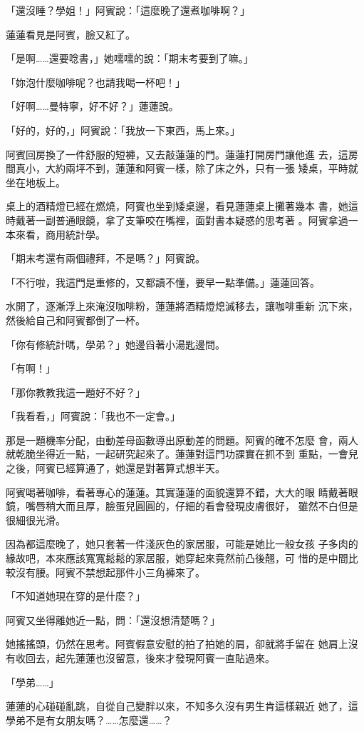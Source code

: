 「還沒睡？學姐！」阿賓說：「這麼晚了還煮咖啡啊？」

蓮蓮看見是阿賓，臉又紅了。

「是啊……還要唸書，」她嚅嚅的說：「期末考要到了嘛。」

「妳泡什麼咖啡呢？也請我喝一杯吧！」

「好啊……曼特寧，好不好？」蓮蓮說。

「好的，好的，」阿賓說：「我放一下東西，馬上來。」

阿賓回房換了一件舒服的短褲，又去敲蓮蓮的門。蓮蓮打開房門讓他進
去，這房間真小，大約兩坪不到，蓮蓮和阿賓一樣，除了床之外，只有一張
矮桌，平時就坐在地板上。

桌上的酒精燈已經在燃燒，阿賓也坐到矮桌邊，看見蓮蓮桌上攤著幾本
書，她這時戴著一副普通眼鏡，拿了支筆咬在嘴裡，面對書本疑惑的思考著
。阿賓拿過一本來看，商用統計學。

「期末考還有兩個禮拜，不是嗎？」阿賓說。

「不行啦，我這門是重修的，又都讀不懂，要早一點準備。」蓮蓮回答。

水開了，逐漸浮上來淹沒咖啡粉，蓮蓮將酒精燈熄滅移去，讓咖啡重新
沉下來，然後給自己和阿賓都倒了一杯。

「你有修統計嗎，學弟？」她邊舀著小湯匙邊問。

「有啊！」

「那你教教我這一題好不好？」

「我看看，」阿賓說：「我也不一定會。」

那是一題機率分配，由動差母函數導出原動差的問題。阿賓的確不怎麼
會，兩人就乾脆坐得近一點，一起研究起來了。蓮蓮對這門功課實在抓不到
重點，一會兒之後，阿賓已經算通了，她還是對著算式想半天。

阿賓喝著咖啡，看著專心的蓮蓮。其實蓮蓮的面貌還算不錯，大大的眼
睛戴著眼鏡，嘴唇稍大而且厚，臉蛋兒圓圓的，仔細的看會發現皮膚很好，
雖然不白但是很細很光滑。

因為都這麼晚了，她只套著一件淺灰色的家居服，可能是她比一般女孩
子多肉的緣故吧，本來應該寬寬鬆鬆的家居服，她穿起來竟然前凸後翹，可
惜的是中間比較沒有腰。阿賓不禁想起那件小三角褲來了。

「不知道她現在穿的是什麼？」

阿賓又坐得離她近一點，問：「還沒想清楚嗎？」

她搖搖頭，仍然在思考。阿賓假意安慰的拍了拍她的肩，卻就將手留在
她肩上沒有收回去，起先蓮蓮也沒留意，後來才發現阿賓一直貼過來。

「學弟……」

蓮蓮的心碰碰亂跳，自從自己變胖以來，不知多久沒有男生肯這樣親近
她了，這學弟不是有女朋友嗎？……怎麼還……？


